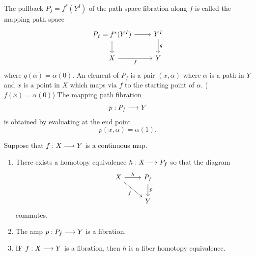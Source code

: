 \documentclass[11pt]{book} %
\begin{document}
\begin{definition}
The pullback $P_f=f^*(Y^I)$ of the path space fibration along $f$ is called the mapping path space
$$
\begin{tikzcd}
P_f=f^*(Y^I) \arrow[d] \arrow[r] & Y^I \arrow[d, "q"] \\
X \arrow[r, "f"'] & Y
\end{tikzcd}
$$
where $q(\alpha)=\alpha(0)$.
An element of $P_f$ is a pair $(x,\alpha)$ where $\alpha$ is a path in $Y$ and $x$ is a point in $X$ which maps via $f$ to the starting point of $\alpha$. ($f(x)=\alpha(0)$) The mapping path fibration 
$$
p:P_f\longrightarrow Y
$$
is obtained by evaluating at the end point
$$
p(x,\alpha)=\alpha(1).
$$
\end{definition}
\begin{theorem}\label{thm:factorization_fibration_htp_equiv}
Suppose that $f: X\longrightarrow Y$ is a continuous map.
\begin{enumerate}[label=(\alph*)]
\item There exists a homotopy equivalence $h:X\longrightarrow P_f$ so that the diagram
$$
\begin{tikzcd}
X \arrow[rd, "f"'] \arrow[r, "h"] & P_f \arrow[d, "p"] \\
 & Y
\end{tikzcd}
$$
commutes.
\item The amp $p: P_f\longrightarrow Y$ is a fibration. 
\item IF $f: X\longrightarrow Y$ is a fibration, then $h$ is a fiber homotopy equivalence.
\end{enumerate}
\end{theorem}
\end{document}
